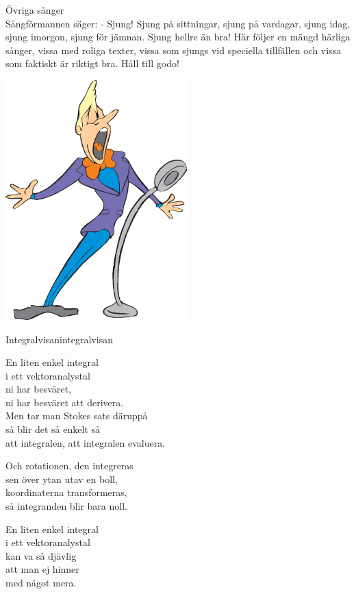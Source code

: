 \begin{flushleft}
{\Huge Övriga sånger\\}
\vspace{1cm}
{\Large
Sångförmannen säger:
- Sjung! Sjung på sittningar, sjung på vardagar, sjung idag, sjung
imorgon, sjung för jämnan. Sjung hellre än bra! Här följer en mängd härliga sånger, vissa
med roliga texter, vissa som sjungs vid speciella tillfällen och vissa
som faktiskt är riktigt bra. Håll till godo! 
}
\end{flushleft}

\begin{center}
\vspace{2cm}
\includegraphics[width=7cm]{bilder/84.eps}
\end{center}

\newpage

\begin{song}{Integralvisan}{integralvisan}
\begin{vers}
En liten enkel integral\\
i ett vektoranalystal\\
ni har besväret,\\
ni har besväret att derivera.\\
Men tar man Stokes sats däruppå\\
så blir det så enkelt så\\
att integralen, att integralen evaluera.\\
\end{vers}
\begin{vers}
Och rotationen, den integreras\\
sen över ytan utav en boll,\\
koordinaterna transformeras,\\
så integranden blir bara noll.\\
\end{vers}
\begin{vers}
En liten enkel integral\\
i ett vektoranalystal \\
kan va så djävlig\\
att man ej hinner\\
med något mera.\\
\end{vers}
\end{song}

